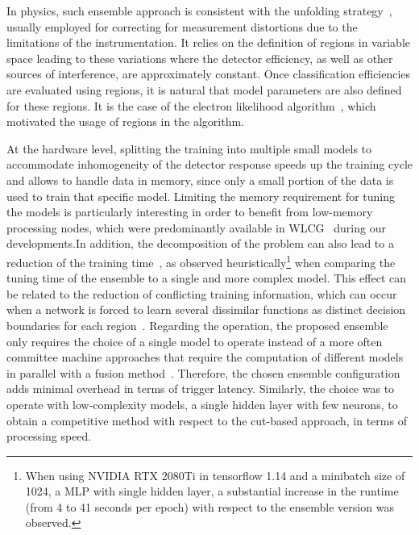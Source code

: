 In physics, such ensemble approach is consistent with the unfolding
strategy~\cite{unfolding_book}, usually employed for correcting for
measurement distortions due to the limitations of the instrumentation. It relies
on the definition of regions in variable space leading to these
variations where the detector efficiency, as well as other
sources of interference, are approximately constant. Once classification
efficiencies are evaluated using regions, it is natural that model parameters
are also defined for these regions. It is the case of the electron likelihood
algorithm~\cite{atlas_electron_id_offline}, which motivated the usage of
\eteta{} regions in the \rnn{} algorithm.



At the hardware level, splitting the training into multiple small models to accommodate inhomogeneity of the detector response speeds up the training cycle and allows to handle data in memory, since only a small portion of the data is used to train that specific model. Limiting the memory requirement for tuning
the models is particularly interesting in order to benefit from low-memory 
 processing nodes, which were predominantly available in 
WLCG~\cite{2015_lcg_tdr} during our
developments.\@ In addition, the decomposition of the problem can also lead to a
reduction of the training time~\cite{Polikar2006}, as observed heuristically\footnote{
  When using NVIDIA RTX 2080Ti in tensorflow 1.14 and a minibatch size of 1024, a 
  MLP with single hidden layer, a substantial increase in the runtime (from 4 
  to 41 seconds per epoch) with respect to the ensemble version was observed.} when
comparing the tuning time of the ensemble to a single and more complex model. This effect can be related to the reduction of conflicting training information, which can occur when a network is forced to learn several dissimilar functions
as distinct decision boundaries for each region~\cite{Auda1999,haykin_2008}.
Regarding the operation, the proposed ensemble only requires the choice of a
single model to operate instead of a more often committee machine approaches
that require the computation of different models in parallel with a fusion
method~\cite{zhou_ensemble}.  Therefore, the chosen ensemble configuration adds
minimal overhead in terms of trigger latency. Similarly, the choice was to
operate with low-complexity models, a single hidden layer with few neurons, to obtain a competitive method with respect to the cut-based
approach, in terms of processing speed.



